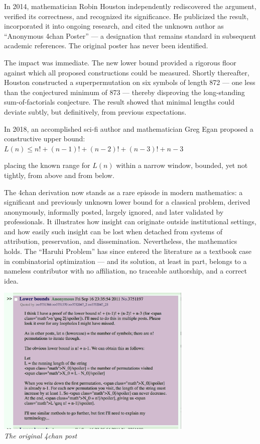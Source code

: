 In 2014, mathematician Robin Houston independently rediscovered the argument, verified its correctness, and recognized its significance. He publicized the result, incorporated it into ongoing research, and cited the unknown author as “Anonymous 4chan Poster” — a designation that remains standard in subsequent academic references. The original poster has never been identified.

The impact was immediate. The new lower bound provided a rigorous floor against which all proposed constructions could be measured. Shortly thereafter, Houston constructed a superpermutation on six symbols of length 872 — one less than the conjectured minimum of 873 — thereby disproving the long-standing sum-of-factorials conjecture. The result showed that minimal lengths could deviate subtly, but definitively, from previous expectations.

In 2018, an accomplished sci-fi author and mathematician Greg Egan proposed a constructive upper bound: $L(n) \leq n! + (n-1)! + (n-2)! + (n-3)! + n - 3$

placing the known range for $L(n)$ within a narrow window, bounded, yet not tightly, from above and from below.

The 4chan derivation now stands as a rare episode in modern mathematics: a significant and previously unknown lower bound for a classical problem, derived anonymously, informally posted, largely ignored, and later validated by professionals. It illustrates how insight can originate outside institutional settings, and how easily such insight can be lost when detached from systems of attribution, preservation, and dissemination. Nevertheless, the mathematics holds. The “Haruhi Problem” has since entered the literature as a textbook case in combinatorial optimization — and its solution, at least in part, belongs to a nameless contributor with no affiliation, no traceable authorship, and a correct idea.

\vspace{2em}
\begin{center}
    \includegraphics[width=0.7\textwidth]{39_SuperpermutationsBreakthrough/DrTcMa7VYAApwpb.png}\\
    {\small\textit{The original 4chan post}}
\end{center}

